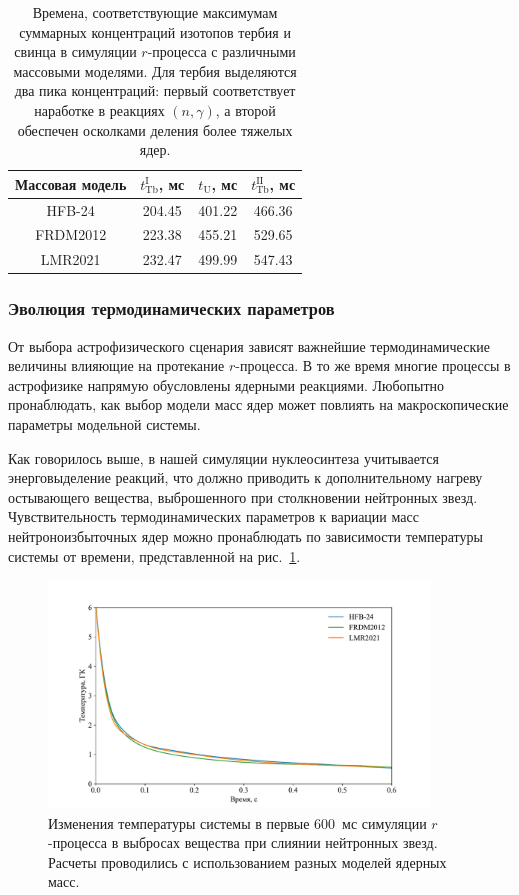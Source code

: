\begin{table}
\center
\begin{tabular}{c c c c}
\hline
\rule{0pt}{2.6ex}
Массовая модель & $t^\text{I}_\text{Tb}$, мс & $t_\text{U}$, мс 
& $t^\text{II}_\text{Tb}$, мс
\rule[-1.2ex]{0pt}{0pt} \\
\hline
\rule{0pt}{2.2ex}
HFB-24 & 204.45 & 401.22 & 466.36 \\
\rule{0pt}{2.2ex}
FRDM2012 & 223.38 & 455.21 & 529.65 \\
\rule{0pt}{2.2ex}
LMR2021 & 232.47 & 499.99 & 547.43 \\
\hline
\end{tabular}
\caption{Времена, соответствующие максимумам суммарных концентраций изотопов тербия и свинца в симуляции $r$-процесса с различными массовыми моделями. Для тербия выделяются два пика концентраций: первый соответствует наработке в реакциях $(n,\gamma)$, а второй обеспечен осколками деления более тяжелых ядер.}
\label{tab:process-times}
\end{table}

\subsubsection{Эволюция термодинамических параметров}
От выбора астрофизического сценария зависят важнейшие термодинамические величины влияющие на протекание $r$-процесса. В то же время многие процессы в астрофизике напрямую обусловлены ядерными реакциями. Любопытно пронаблюдать, как выбор модели масс ядер может повлиять на макроскопические параметры модельной системы.

Как говорилось выше, в нашей симуляции нуклеосинтеза учитывается энерговыделение реакций, что должно приводить к дополнительному нагреву остывающего вещества, выброшенного при столкновении нейтронных звезд. Чувствительность термодинамических параметров к вариации масс нейтроноизбыточных ядер можно пронаблюдать по зависимости температуры системы от времени, представленной на рис.~\ref{fig:temp}.

\begin{figure}
\centering
\includegraphics[width=0.9\textwidth]{../pics/temp.pdf}
\caption{Изменения температуры системы в первые 600~мс симуляции $r$-процесса в выбросах вещества при слиянии нейтронных звезд. Расчеты проводились с использованием разных моделей ядерных масс.}
\label{fig:temp}
\end{figure}

